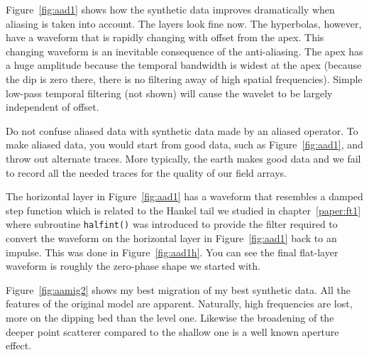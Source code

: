 Figure~\ref{fig:aad1} shows how the synthetic data improves dramatically
when aliasing is taken into account.
The layers look fine now.
The hyperbolas, however,
have a waveform that is rapidly changing
with offset from the apex.
This changing waveform is an inevitable consequence of the anti-aliasing.
The apex has a huge amplitude
because the temporal bandwidth is widest at the apex
(because the dip is zero there,
there is no filtering away of high spatial frequencies).
Simple low-pass temporal filtering (not shown)
will cause the wavelet to be largely independent of offset.

\par
Do not confuse aliased data with synthetic data made by an aliased operator.
To make aliased data, you would start from good data,
such as Figure~\ref{fig:aad1},
and throw out alternate traces.
More typically, the earth makes good data and we fail to record
all the needed traces for the quality of our field arrays.

\par
The horizontal layer in Figure~\ref{fig:aad1}
has a waveform that resembles a damped step function
which is related to the Hankel tail we studied in chapter~\ref{paper:ft1}
where subroutine \texttt{halfint()}  was introduced
to provide the filter required to convert
the waveform on the  horizontal layer in Figure~\ref{fig:aad1} back to an impulse.
This was done in Figure~\ref{fig:aad1h}.
You can see the final flat-layer waveform
is roughly the zero-phase shape we started with.

Figure~\ref{fig:aamig2} shows my best migration of my best synthetic data.
All the features of the original model are apparent.
Naturally, high frequencies are lost,
more on the dipping bed than the level one.  
Likewise the broadening of the deeper point scatterer compared
to the shallow one is a well known aperture effect.


